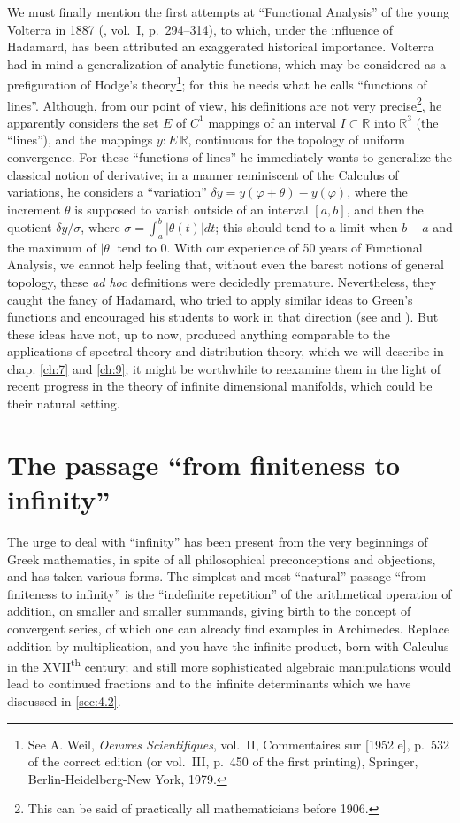 \documentclass[12pt,a4paper,leqno,twoside]{extbook}
\newcommand{\supth}{\texorpdfstring{\textsuperscript{th}}{th}}
\newcommand{\R}{\mathbb{R}}
\begin{document}
We must finally mention the first attempts at ``Functional Analysis'' of the young Volterra in 1887 (\cite{219}, vol.~I, p.~294--314), to which, under the influence of Hadamard, has been attributed an exaggerated historical importance. Volterra had in mind a generalization of analytic functions, which may be considered as a prefiguration of Hodge's theory\footnote{See A. Weil, \emph{Oeuvres Scientifiques}, vol.~II, Commentaires sur [1952 e], p.~532 of the correct edition (or vol.~III, p.~450 of the first printing), Springer, Berlin-Heidelberg-New York, 1979.}; for this he needs what he calls ``functions of lines''. Although, from our point of view, his definitions are not very precise\footnote{This can be said of practically all mathematicians before 1906.}, he apparently considers the set \(E\) of \(C^1\) mappings of an interval \(I \subset \R\) into \(\R^3\) (the ``lines''), and the mappings \(y: E \ \R\), continuous for the topology of uniform convergence. For these ``functions of lines'' he immediately wants to generalize the classical notion of derivative; in a manner reminiscent of the Calculus of variations, he considers a ``variation'' \(\delta y = y(\varphi + \theta) - y(\varphi)\), where the increment \(\theta\) is supposed to vanish outside of an interval \([a, b]\), and then the quotient \(\delta y/\sigma\), where \(\sigma = \int_a^b |\theta(t)|dt\); this should tend to a limit when \(b-a\) and the maximum of \(|\theta|\) tend to 0. With our experience of 50 years of Functional Analysis, we cannot help feeling that, without even the barest notions of general topology, these \emph{ad hoc} definitions were decidedly premature. Nevertheless, they caught the fancy of Hadamard, who tried to apply similar ideas to Green's functions and encouraged his students to work in that direction (see \cite[vol.~I, p.~401--404 and 435--453]{094} and \cite{146}). But these ideas have not, up to now, produced anything comparable to the applications of spectral theory and distribution theory, which we will describe in chap. \ref{ch:7} and \ref{ch:9}; it might be worthwhile to reexamine them in the light of recent progress in the theory of infinite dimensional manifolds, which could be their natural setting.

\section{The passage ``from finiteness to infinity''}
\label{sec:4.4}

The urge to deal with ``infinity'' has been present from the very beginnings of Greek mathematics, in spite of all philosophical preconceptions and objections, and has taken various forms. The simplest and most ``natural'' passage ``from finiteness to infinity'' is the ``indefinite repetition'' of the arithmetical operation of addition, on smaller and smaller summands, giving birth to the concept of convergent series, of which one can already find examples in Archimedes. Replace addition by multiplication, and you have the infinite product, born with Calculus in the XVII\supth{} century; and still more sophisticated algebraic manipulations would lead to continued fractions and to the infinite determinants which we have discussed in \ref{sec:4.2}.
\end{document}
